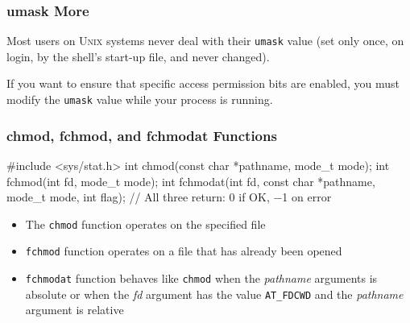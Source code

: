 \documentclass[newPxFont,sthlmFooter,nooffset]{beamer}
\begin{document}
\begin{frame}[t]
  \frametitle{umask More}
Most users on \textsc{Unix} systems never deal with their \texttt{umask} value (set only once, on login, by the shell's start-up file, and never changed).
\bigskip

If you want to ensure that specific access permission bits are enabled, you must modify the \texttt{umask} value while your process is running.

\end{frame}



\begin{frame}[containsverbatim,t]
    \frametitle{chmod, fchmod, and fchmodat Functions}
\begin{codedef}
#include <sys/stat.h>
int chmod(const char *pathname, mode_t mode);
int fchmod(int fd, mode_t mode);
int fchmodat(int fd, const char *pathname, mode_t mode, int flag);
// All three return: 0 if OK, −1 on error
\end{codedef}
\bigskip

\begin{itemize}
\item The \texttt{chmod} function operates on the specified file
\item \texttt{fchmod} function operates on a file that has already been opened
\item \texttt{fchmodat} function behaves like \texttt{chmod} when the \textit{pathname}  arguments is absolute or when the \textit{fd} argument has the value \texttt{AT\_FDCWD} and the \textit{pathname} argument is relative
\end{itemize}
\end{frame}
\end{document}
